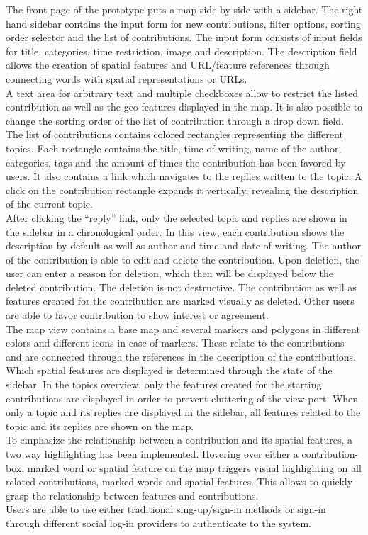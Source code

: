 \documentclass{sigchi}
\begin{document}
The front page of the prototype puts a map side by side with a sidebar. The right hand sidebar contains the input form for new contributions, filter options, sorting order selector and the list of contributions. The input form consists of input fields for title, categories, time restriction, image and description. The description field allows the creation of spatial features and URL/feature references through connecting words with spatial representations or URLs.\\
A text area for arbitrary text and multiple checkboxes allow to restrict the listed contribution as well as the geo-features displayed in the map. It is also possible to change the sorting order of the list of contribution through a drop down field.\\
The list of contributions contains colored rectangles representing the different topics. Each rectangle contains the title, time of writing, name of the author, categories, tags and the amount of times the contribution has been favored by users. It also contains a link which navigates to the replies written to the topic. A click on the contribution rectangle expands it vertically, revealing the description of the current topic.\\
After clicking the ``reply'' link, only the selected topic and replies are shown in the sidebar in a chronological order. In this view, each contribution shows the description by default as well as author and time and date of writing. The author of the contribution is able to edit and delete the contribution. Upon deletion, the user can enter a reason for deletion, which then will be displayed below the deleted contribution. The deletion is not destructive. The contribution as well as features created for the contribution are marked visually as deleted. Other users are able to favor contribution to show interest or agreement.\\
The map view contains a base map and several markers and polygons in different colors and different icons in case of markers. These relate to the contributions and are connected through the references in the description of the contributions. Which spatial features are displayed is determined through the state of the sidebar. In the topics overview, only the features created for the starting contributions are displayed in order to prevent cluttering of the view-port. When only a topic and its replies are displayed in the sidebar, all features related to the topic and its replies are shown on the map.\\
To emphasize the relationship between a contribution and its spatial features, a two way highlighting has been implemented. Hovering over either a contribution-box, marked word or spatial feature on the map triggers visual highlighting on all related contributions, marked words and spatial features. This allows to quickly grasp the relationship between features and contributions.\\
Users are able to use either traditional sing-up/sign-in methods or sign-in through different social log-in providers to authenticate to the system.
\end{document}
